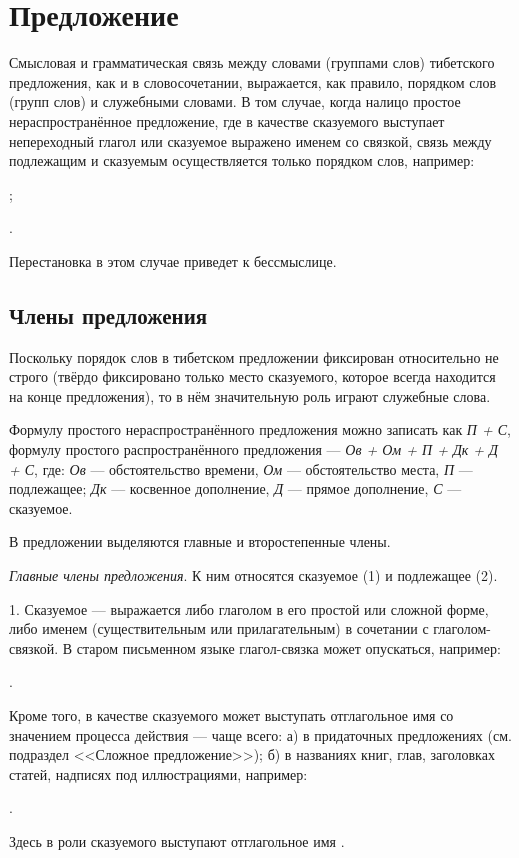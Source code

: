\section{Предложение}

Смысловая и грамматическая связь между словами (группами слов) тибетского предложения, как и в словосочетании, выражается, как правило, порядком слов (групп слов) и служебными словами. В том случае, когда налицо простое нераспространённое предложение, где в качестве сказуемого выступает непереходный глагол или сказуемое выражено именем со связкой, связь между подлежащим и сказуемым осуществляется только порядком слов, например:
\begin{prfsample}
	\item {};
	\item {}.
\end{prfsample}
Перестановка в этом случае приведет к бессмыслице.

\subsection{Члены предложения}

Поскольку порядок слов в тибетском предложении фиксирован относительно не строго (твёрдо фиксировано только место сказуемого, которое всегда находится на конце предложения), то в нём значительную роль играют служебные слова.

Формулу простого нераспространённого предложения можно записать как \emph{П + С}, формулу простого распространённого предложения --- \emph{Ов + Ом + П + Дк + Д + С}, где:
\emph{Ов} --- обстоятельство времени,
\emph{Ом} --- обстоятельство места,
\emph{П} --- подлежащее;
\emph{Дк} --- косвенное дополнение,
\emph{Д} --- прямое дополнение,
\emph{С} --- сказуемое.

В предложении выделяются главные и второстепенные члены.

\emph{Главные члены предложения}. К ним относятся сказуемое (1) и подлежащее (2).

1. Сказуемое --- выражается либо глаголом в его простой или сложной форме, либо именем (существительным или прилагательным) в сочетании с глаголом-связкой. В старом письменном языке глагол-связка может опускаться, например:
\begin{prfsample}
	\item {}.
\end{prfsample}
Кроме того, в качестве сказуемого может выступать отглагольное имя со значением процесса действия --- чаще всего: а) в придаточных предложениях (см. подраздел <<Сложное предложение>>); б) в названиях книг, глав, заголовках статей, надписях
под иллюстрациями, например:
\begin{prfsample}
	\item {}.
\end{prfsample}
Здесь в роли сказуемого выступают отглагольное имя .

